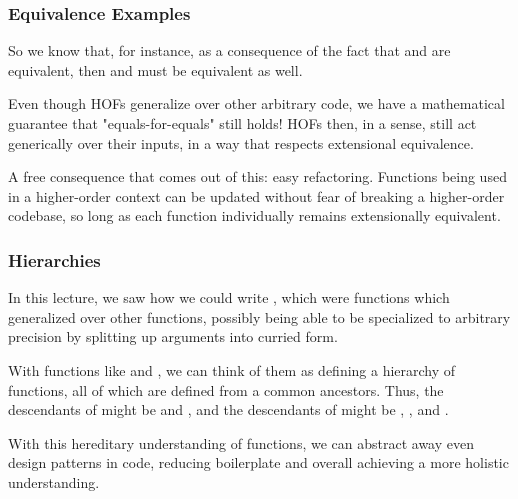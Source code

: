 \documentclass[aspectratio=169, handout]{beamer}
\begin{document}
\begin{frame}[fragile]
  \frametitle{Equivalence Examples}

  So we know that, for instance, as a consequence of the fact that 
  and  are equivalent, then  and
   must be equivalent as well.

  \pause
  \vspace{\fill}

  Even though HOFs generalize over other arbitrary code, we have a mathematical guarantee
  that "equals-for-equals" still holds! HOFs then, in a sense, still act generically over
  their inputs, in a way that respects extensional equivalence.

  \pause
  \vspace{\fill}

  A free consequence that comes out of this: easy refactoring. Functions being
  used in a higher-order context can be updated without fear of breaking a
  higher-order codebase, so long as each function individually remains
  extensionally equivalent.\footnotemark

\end{frame}

\begin{frame}[fragile]
  \frametitle{Hierarchies}

  In this lecture, we saw how we could write , which were
  functions which generalized over other functions, possibly being able to be specialized
  to arbitrary precision by splitting up arguments into curried form.

  \pause
  \vspace{\fill}

  With functions like  and , we can think of them as defining
  a hierarchy of functions, all of which are defined from a common ancestors. Thus, the
  descendants of  might be  and ,
  and the descendants of  might be , , and .

  \pause
  \vspace{\fill}

  With this hereditary understanding of functions, we can abstract away even design patterns
  in code, reducing boilerplate and overall achieving a more holistic understanding.
\end{frame}
\end{document}
